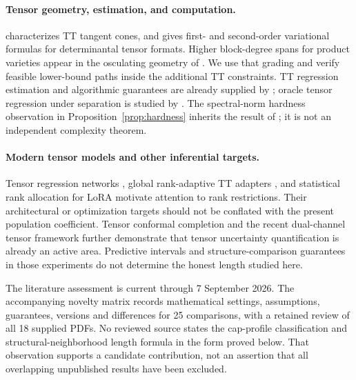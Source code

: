 \paragraph{Tensor geometry, estimation, and computation.}
\citet{kutschan2018} characterizes TT tangent cones, and \citet{yang2025} gives first- and second-order variational formulas for determinantal tensor formats. Higher block-degree spans for product varieties appear in the osculating geometry of \citet{araujo2019}. We use that grading and verify feasible lower-bound paths inside the additional TT constraints. TT regression estimation and algorithmic guarantees are already supplied by \citet{qin2025}; oracle tensor regression under separation is studied by \citet{wang2025}. The spectral-norm hardness observation in Proposition~\ref{prop:hardness} inherits the result of \citet{hillarlim2013}; it is not an independent complexity theorem.

\paragraph{Modern tensor models and other inferential targets.}
Tensor regression networks \citep{kossaifi2020}, global rank-adaptive TT adapters \citep{metatt2026}, and statistical rank allocation for LoRA \citep{gao2026} motivate attention to rank restrictions. Their architectural or optimization targets should not be conflated with the present population coefficient. Tensor conformal completion \citep{suncheng2026} and the recent dual-channel tensor framework \citep{dual2026} further demonstrate that tensor uncertainty quantification is already an active area. Predictive intervals and structure-comparison guarantees in those experiments do not determine the honest length studied here.

The literature assessment is current through 7 September 2026. The accompanying novelty matrix records mathematical settings, assumptions, guarantees, versions and differences for 25 comparisons, with a retained review of all 18 supplied PDFs. No reviewed source states the cap-profile classification and structural-neighborhood length formula in the form proved below. That observation supports a candidate contribution, not an assertion that all overlapping unpublished results have been excluded.
